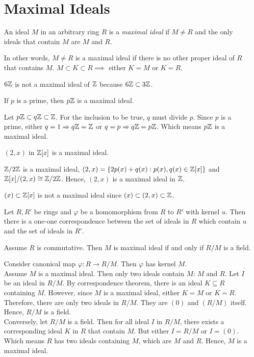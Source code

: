 \section{Maximal Ideals}
\begin{definition}
    An ideal $M$ in an arbitrary ring $R$ is a \textit{maximal ideal} if $M \neq R$ and the only ideals that contain $M$ are $M$ and $R$.
\end{definition}
In other words, $M \neq R$ is a maximal ideal if there is no other proper ideal of $R$ that contains $M$. $M \subset K \subset R \implies$ either $K = M$ or $K = R$.
\begin{noneg}
    $6\mathbb{Z}$ is not a maximal ideal of $\mathbb{Z}$ because $6\mathbb{Z} \subset 3\mathbb{Z}$.
\end{noneg}
\begin{lemma}
    If $p$ is a prime, then $p\mathbb{Z}$ is a maximal ideal.
\end{lemma}
\begin{lemmaproof}
    Let $p\mathbb{Z} \subset q\mathbb{Z} \subset \mathbb{Z}$. For the inclusion to be true, $q$ must divide $p$. Since $p$ is a prime, either $q=1 \Rightarrow q\mathbb{Z} = \mathbb{Z}$ or $q = p \Rightarrow q\mathbb{Z} = p\mathbb{Z}$. Which means $p\mathbb{Z}$ is a maximal ideal.
\end{lemmaproof}
\begin{eg}
    $(2,x)$ in $\mathbb{Z}[x]$ is a maximal ideal.
\end{eg}
\begin{explanation}
    $\mathbb{Z}/2\mathbb{Z}$ is a maximal ideal, $(2,x) = \{2p(x) + q(x): p(x), q(x) \in \mathbb{Z}[x]\}$ and $\mathbb{Z}[x]/(2,x) \cong \mathbb{Z}/2\mathbb{Z}$. Hence, $(2,x)$ is a maximal ideal in $\mathbb{Z}$.
\end{explanation}
\begin{noneg}
    $(x) \subset \mathbb{Z}[x]$ is not a maximal ideal since $(x) \subset (2,x) \subset \mathbb{Z}$.
\end{noneg}
\begin{theorem}
    Let $R, R'$ be rings and $\varphi$ be a homomorphism from $R$ to $R'$ with kernel $u$. Then there is a one-one correspondence between the set of ideals in $R$ which contain $u$ and the set of ideals in $R'$. 
\end{theorem}
\begin{prop}
    Assume $R$ is commutative. Then $M$ is maximal ideal if and only if $R/M$ is a field.
\end{prop}
\begin{propproof}
    Consider canonical map $\varphi: R \rightarrow R/M$. Then $\varphi$ has kernel $M$.\\
    Assume $M$ is a maximal ideal. Then only two ideals contain $M$: $M$ and $R$. Let $I$ be an ideal in $R/M$. By correspondence theorem, there is an ideal $K \subseteq R$ containing $M$. However, since $M$ is a maximal ideal, either $K = M$ or $K = R$. Therefore, there are only two ideals in $R/M$. They are $(0)$ and $(R/M)$ itself. Hence, $R/M$ is a field.\\
    Conversely, let $R/M$ is a field. Then for all ideal $I$ in $R/M$, there exists a corresponding ideal $K$ in $R$ that contain $M$. But either $I = R/M$ or $I = (0)$. Which means $R$ has two ideals containing $M$, which are $M$ and $R$. Hence, $M$ is a maximal ideal.
\end{propproof}
